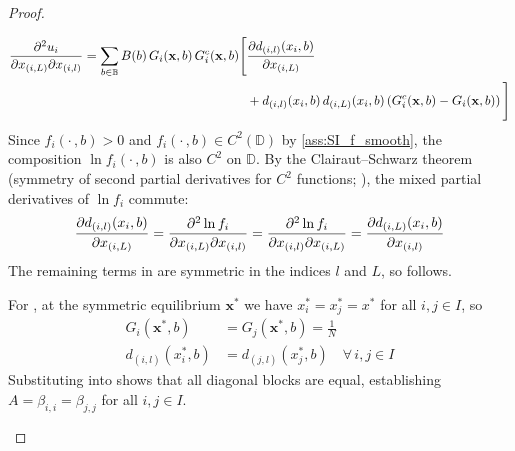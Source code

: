 \documentclass{article}
\begin{document}
\begin{proof}
\begin{enumerate}
                    \begin{align}
                        \pdv[2]{u_i}{x_{(i,L)}}{x_{(i,l)}} = \sum_{b \in \mathbb{B}} B(b)\, 
                        G_i(\mathbf{x},b)\, G_i^c(\mathbf{x},b) \Bigg[
                        &\pdv{d_{(i,l)}(x_i,b)}{x_{(i,L)}} \notag \\
                        &+ d_{(i,l)}(x_i,b)\, d_{(i,L)}(x_i,b)
                        \left(G_i^c(\mathbf{x},b) - G_i(\mathbf{x},b)\right)
                        \Bigg] \label{eq:SI_jacobians_A}
                    \end{align}
                    Since $f_i(\cdot\,,b) > 0$ and $f_i(\cdot\,,b)\in C^2(\mathbb{D})$ by \ref{ass:SI_f_smooth}, the composition $\ln f_i(\cdot\,,b)$ is also $C^2$ on $\mathbb{D}$. By the Clairaut--Schwarz theorem (symmetry of second partial derivatives for $C^2$ functions; \cite[Thm.~9.41]{rudin1976principles}), the mixed partial derivatives of $\ln f_i$ commute:
                    \begin{equation}
                        \pdv{d_{(i,l)}(x_i,b)}{x_{(i,L)}} = 
                        \frac{\partial^2 \ln f_i}{\partial x_{(i,L)}\partial x_{(i,l)}} =
                        \frac{\partial^2 \ln f_i}{\partial x_{(i,l)}\partial x_{(i,L)}} =
                        \pdv{d_{(i,L)}(x_i,b)}{x_{(i,l)}}
                    \end{equation}
                    The remaining terms in  are symmetric in the indices $l$ 
                    and $L$, so  follows.

                    For , at the symmetric 
                    equilibrium $\mathbf{x}^*$ we have $x_i^* = x_j^* = x^*$ for all 
                    $i,j \in I$, so
                    \begin{align}
                        G_i(\mathbf{x}^*,b) &= G_j(\mathbf{x}^*,b) = \tfrac{1}{N} \\
                        d_{(i,l)}(x_i^*,b) &= d_{(j,l)}(x_j^*,b) \quad \forall\, i,j \in I
                    \end{align}
                    Substituting into  shows that all diagonal 
                    blocks are equal, establishing $A = \beta_{i,i} = \beta_{j,j}$ for all 
                    $i,j \in I$.


\end{enumerate}
\end{proof}
\end{document}
